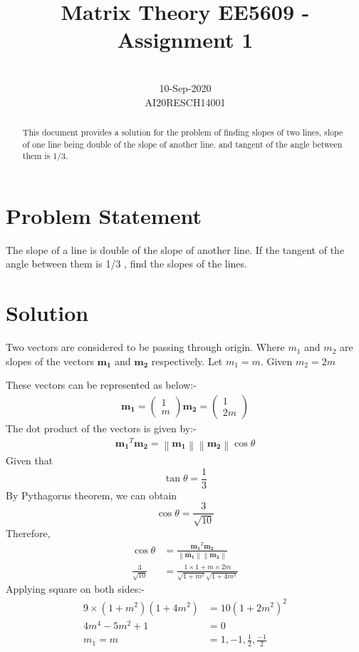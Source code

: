 \documentclass[conference]{IEEEtran}
\let\vec\mathbf
\newcommand{\myvec}[1]{\ensuremath{\begin{pmatrix}#1\end{pmatrix}}}
\newcommand{\norm}[1]{\left\lVert#1\right\rVert}
\begin{document}
\title{Matrix Theory EE5609 - Assignment 1\\ 
}

\author{
 \\
10-Sep-2020\\
AI20RESCH14001\\
 }

\maketitle

\begin{abstract}
This document provides a solution for the problem of finding slopes of two lines,  slope of one line being double of the slope of another line. and tangent of the angle between them is 1/3.
\end{abstract}

\section{Problem Statement}
The slope of a line is double of the slope of another line. If the tangent of the angle between them is 1/3 , find the slopes of the lines.

\section{Solution}
Two vectors are considered to be passing through origin. Where  $m_{1}$   and  $ m_{2}$ are slopes of the vectors $\vec{m_{1}}$   and    $\vec{m_{2}}$ respectively.
Let  $m_{1} = m$. Given  $m_{2} = 2m$

These vectors can be represented as below:-
\begin{align}
\vec{m_{1}} =\myvec{ 1 \\m }
\vec{m_{2}} =\myvec{1\\2m}
 \end{align}
The dot product of the vectors is given by:-
\begin{align}
 \vec{m_{1}} ^T  \vec{m_{2}} = \norm{  \vec{ m_{1}}}\norm{  \vec{m_{2}}}  \cos \theta
\end{align}
Given that 
\begin{equation}
 \tan \theta = \frac{1}{3}
 \end{equation}
 By Pythagorus theorem, we can obtain
\begin{equation}
 \cos \theta = \frac{3}{\sqrt{10}}
 \end{equation}
Therefore,
\begin{align}
\cos \theta &= \frac{\vec{m_{1}}^T  \vec{m_{2}}}{\vec{\norm{ m_{1}}} \norm{ \vec{m_{2}}}}\\
\frac{3}{\sqrt{10}} &=  \frac{1 \times 1 + {m \times 2m}}{{\sqrt{1 + m^2}\sqrt{1 +4 m^2}}}
\end{align}
Applying square on both sides:-
\begin{align}
9 \times (1 + m^2) (1 + 4 m^2) & = 10 ( 1 + 2 m^2)^2\\ 
4 m^4 - 5 m^2 + 1 &=0\\ 
m_{1} = m &= 1, -1,\frac{1}{2},\frac{-1}{2}
\end{align}
\end{document}
